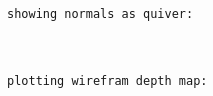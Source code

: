 \documentclass[11pt]{article}
\begin{document}
    \begin{Verbatim}[commandchars=\\\{\}]
showing normals as quiver:
\end{Verbatim}

    \begin{center}
    \end{center}
    { \hspace*{\fill} \\}
    
    \begin{Verbatim}[commandchars=\\\{\}]
plotting wirefram depth map:
\end{Verbatim}

    \begin{center}
    \end{center}
    { \hspace*{\fill} \\}
    
    \begin{center}
    \end{center}
    { \hspace*{\fill} \\}
    
\end{document}
